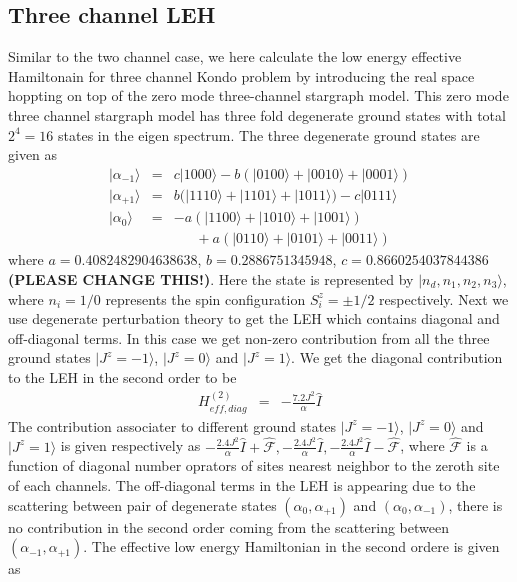\documentclass[reprint,prb,superscriptaddress]{revtex4-2}
\begin{document}
\subsection{Three channel LEH}
\noindent Similar to the two channel case, we here calculate the low energy effective Hamiltonain for three channel Kondo problem by introducing the real space hoppting on top of the zero mode three-channel stargraph model. This zero mode three channel stargraph model has three fold degenerate ground states with total $2^4=16$ states in the eigen spectrum. The three degenerate ground states are given as 
\begin{eqnarray}
|\alpha_{-1}\rangle &=& c|1000 \rangle-b (|0100 \rangle + |0010 \rangle+ | 0001 \rangle) \nonumber\\
|\alpha_{+1}\rangle &=& b(|1110 \rangle+ | 1101 \rangle + | 1011 \rangle)-c | 0111 \rangle \nonumber\\
|\alpha_0\rangle &=& -a(|1100 \rangle + |1010\rangle +|1001 \rangle)\nonumber\\
&&~~~~~~~+a(|0110 \rangle+| 0101 \rangle +| 0011\rangle)
\end{eqnarray}
where $a=0.4082482904638638 $, $b=0.2886751345948 $, $c=0.8660254037844386$ \textbf{(PLEASE CHANGE THIS!)}. Here the state is represented by $|n_{d},n_1,n_2,n_3\rangle$, where $n_i=1/0$ represents the spin configuration $S_i^z=\pm 1/2$ respectively. Next we use degenerate perturbation theory to get the LEH which contains diagonal and off-diagonal terms. In this case we get non-zero contribution from all the three ground states $|J^z=-1\rangle$, $|J^z=0\rangle$ and $|J^z=1\rangle$. We get the diagonal contribution to the LEH in the second order to be
\begin{eqnarray}
H^{(2)}_{eff, diag} &=& - \frac{7.2 J^2}{\alpha} \hat{I}
\end{eqnarray}
The contribution associater to different ground states $|J^z=-1\rangle$, $|J^z=0\rangle$ and $|J^z=1\rangle$ is given respectively as $- \frac{2.4 J^2}{\alpha} \hat{I} + \hat{\mathcal{F}},- \frac{2.4 J^2}{\alpha} \hat{I} ,- \frac{2.4 J^2}{\alpha} \hat{I} - \hat{\mathcal{F} }$,
\noindent where $\hat{\mathcal{F}}$ is a function of diagonal number oprators of sites nearest neighbor to the zeroth site of each channels. The off-diagonal terms in the LEH is appearing due to the scattering between pair of degenerate states $(\alpha_0,\alpha_{+1})$ and $(\alpha_0,\alpha_{-1})$, there is no contribution in the second order coming from the scattering between $(\alpha_{-1},\alpha_{+1})$. The effective low energy Hamiltonian in the second ordere is given as
\end{document}
